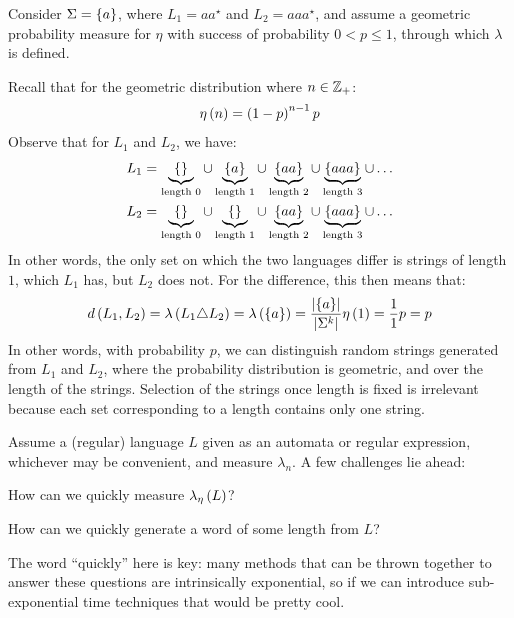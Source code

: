 \begin{example}
  Consider \(\Sigma = \left\{a\right\}\),
  where \(L_1 = aa^\star\) and \(L_2 = aaa^\star\),
  and assume a geometric probability measure for \(\eta\)
  with success of probability \(0 < p \leq 1\),
  through which \(\lambda\) is defined.

  Recall that for the geometric distribution where \(n \in \mathbb{Z}_{+}\):
  \begin{align*}
    \eta\left(n\right) = \left(1 - p\right)^{n - 1} p
  \end{align*}
  Observe that for \(L_1\) and \(L_2\), we have:
  \begin{align*}
    L_1 &=
      \underbrace{\left\{\right\}}_{\text{length \(0\)}} \cup
      \underbrace{\left\{a\right\}}_{\text{length \(1\)}} \cup
      \underbrace{\left\{aa\right\}}_{\text{length \(2\)}} \cup
      \underbrace{\left\{aaa\right\}}_{\text{length \(3\)}} \cup
      \ldots \\
    L_2 &= 
      \underbrace{\left\{\right\}}_{\text{length \(0\)}} \cup
      \underbrace{\left\{\right\}}_{\text{length \(1\)}} \cup
      \underbrace{\left\{aa\right\}}_{\text{length \(2\)}} \cup
      \underbrace{\left\{aaa\right\}}_{\text{length \(3\)}} \cup
      \ldots
  \end{align*}
  In other words, the only set on which the two languages differ is
  strings of length \(1\), which \(L_1\) has, but \(L_2\) does not.
  For the difference, this then means that:
  \begin{align*}
    d\left(L_1, L_2\right)
      = \lambda\left(L_1 \triangle L_2\right)
      = \lambda\left(\left\{a\right\}\right)
      = \frac{\left\lvert\left\{a\right\}\right\rvert}{\left\lvert\Sigma^k\right\rvert} \eta \left(1\right)
      = \frac{1}{1} p = p
  \end{align*}
  In other words, with probability \(p\),
  we can distinguish random strings generated from \(L_1\) and \(L_2\),
  where the probability distribution is geometric,
  and over the length of the strings.
  Selection of the strings once length is fixed is irrelevant because
  each set corresponding to a length contains only one string.
\end{example}

Assume a (regular) language \(L\) given as an automata or regular
expression, whichever may be convenient, and measure \(\lambda_{n}\).
A few challenges lie ahead:

\begin{question}
  How can we quickly measure \(\lambda_{\eta}\left(L\right)\)?
\end{question}

\begin{question}
  How can we quickly generate a word of some length from \(L\)?
\end{question}

The word ``quickly'' here is key:
many methods that can be thrown together to answer these questions
are intrinsically exponential,
so if we can introduce sub-exponential time techniques
that would be pretty cool.







